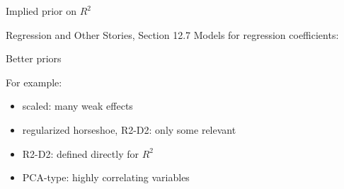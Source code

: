 \documentclass[english,t]{beamer}
\begin{document}
\begin{frame}{Implied prior on $R^2$}

  Regression and Other Stories, Section 12.7 Models for regression
  coefficients: 


  
\end{frame}

\begin{frame}{Better priors}

  For example:
  \begin{itemize}
  \item scaled: many weak effects
  \item regularized horseshoe, R2-D2: only some relevant
  \item R2-D2: defined directly for $R^2$
  \item PCA-type: highly correlating variables
  \end{itemize}

\end{frame}
\end{document}
